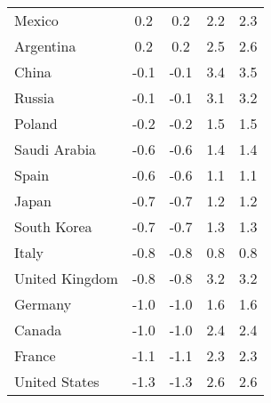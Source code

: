 \begin{tabular}[t]{lcccc}
Mexico & 0.2 & 0.2 & 2.2 & 2.3\\
Argentina & 0.2 & 0.2 & 2.5 & 2.6\\
China & -0.1 & -0.1 & 3.4 & 3.5\\
Russia & -0.1 & -0.1 & 3.1 & 3.2\\
Poland & -0.2 & -0.2 & 1.5 & 1.5\\
Saudi Arabia & -0.6 & -0.6 & 1.4 & 1.4\\
Spain & -0.6 & -0.6 & 1.1 & 1.1\\
Japan & -0.7 & -0.7 & 1.2 & 1.2\\
South Korea & -0.7 & -0.7 & 1.3 & 1.3\\
Italy & -0.8 & -0.8 & 0.8 & 0.8\\
United Kingdom & -0.8 & -0.8 & 3.2 & 3.2\\
Germany & -1.0 & -1.0 & 1.6 & 1.6\\
Canada & -1.0 & -1.0 & 2.4 & 2.4\\
France & -1.1 & -1.1 & 2.3 & 2.3\\
United States & -1.3 & -1.3 & 2.6 & 2.6\\
\bottomrule
\end{tabular}